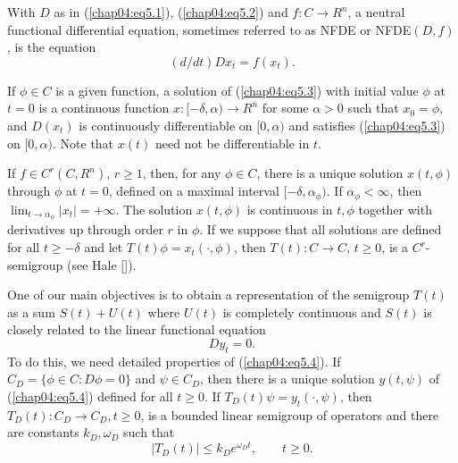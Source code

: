 \documentclass{surv-l}
\theoremstyle{plain}
\theoremstyle{definition}
\numberwithin{equation}{section}
\numberwithin{figure}{chapter}
\begin{document}
With $D$ as in (\ref{chap04:eq5.1}), (\ref{chap04:eq5.2}) and $f: C\rightarrow R^{n}$, a neutral functional differential equation, sometimes referred to as NFDE or NFDE$(D, f)$, is the equation
\begin{equation}\label{chap04:eq5.3}
(d/dt)Dx_{t}=f(x_{t}).
\end{equation}

If $\phi\in C$ is a given function, a solution of (\ref{chap04:eq5.3}) with initial value $\phi$ at $t=0$ is a continuous function $x: [-\delta, \alpha)\rightarrow R^{n}$ for some $\alpha>0$ such that $x_{0}=\phi$, and $D(x_{t})$ is continuously differentiable on $[0, \alpha)$ and satisfies (\ref{chap04:eq5.3}) on $[0, \alpha)$. Note that $x(t)$ need not be differentiable in $t$.

If $f\in C^{r}(C, R^{n})$, $r\geq 1$, then, for any $\phi \in C$, there is a unique solution $x(t, \phi)$ through $\phi$ at $t=0$, defined on a maximal interval $[-\delta, \alpha_{\phi})$. If $\alpha_{\phi}<\infty$, then $\lim_{t\rightarrow\alpha_{\phi}}|x_{t}|=+\infty$. The solution $x(t, \phi)$ is continuous in $t, \phi$ together with derivatives up through order $r$ in $\phi$. If we suppose that all solutions are defined for all $t\geq-\delta$ and let $T(t)\phi=x_{t}(\cdot, \phi)$, then $T(t)\!:C\rightarrow C,\, t\geq 0$, is a $C^{r}$-semigroup (see Hale [\citeyear{1977h}]).

One of our main objectives is to obtain a representation of the semigroup $T(t)$ as a sum $S(t)+U(t)$ where $U(t)$ is completely continuous and $S(t)$ is closely related to the linear functional equation
\begin{equation}\label{chap04:eq5.4}
Dy_{t}=0.
\end{equation}
To do this, we need detailed properties of (\ref{chap04:eq5.4}). If $C_{D}=\{\phi\in C\!:D\phi =0\}$ and $\psi\in C_{D}$, then there is a unique solution $y(t, \psi)$ of (\ref{chap04:eq5.4}) defined for all $t\geq 0$. If $T_{D}(t)\psi=y_{t}(\cdot, \psi)$, then $T_{D}(t)\!:C_{D}\rightarrow C_{D}, t\geq 0$, is a bounded linear semigroup of operators and there are constants $k_{D}, \omega_{D}$ such that
\begin{equation}\label{chap04:eq5.5}
|T_{D}(t)|\leq k_{D}e^{\omega_{D}t},\qquad t\geq 0.
\end{equation}
\end{document}
